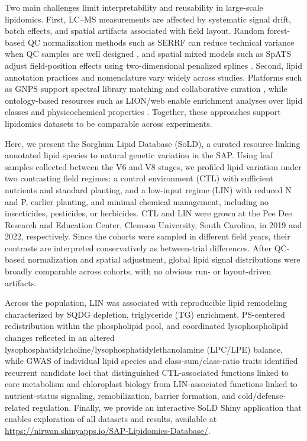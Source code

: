 \documentclass[9pt,twocolumn,twoside]{rilabRxiv}
\begin{document}
Two main challenges limit interpretability and reusability in large-scale lipidomics. First, LC--MS measurements are affected by systematic signal drift, batch effects, and spatial artifacts associated with field layout. Random forest-based QC normalization methods such as SERRF can reduce technical variance when QC samples are well designed \citep{Fan2019}, and spatial mixed models such as SpATS adjust field-position effects using two-dimensional penalized splines \citep{RodriguezAlvarez2018}. Second, lipid annotation practices and nomenclature vary widely across studies. Platforms such as GNPS support spectral library matching and collaborative curation \citep{Wang2016}, while ontology-based resources such as LION/web enable enrichment analyses over lipid classes and physicochemical properties \citep{Molenaar2019}. Together, these approaches support lipidomics datasets to be comparable across experiments.


Here, we present the Sorghum Lipid Database (SoLD), a curated resource linking annotated lipid species to natural genetic variation in the SAP. Using leaf samples collected between the V6 and V8 stages, we profiled lipid variation under two contrasting field regimes: a control environment (CTL) with sufficient nutrients and standard planting, and a low-input regime (LIN) with reduced N and P, earlier planting, and minimal chemical management, including no insecticides, pesticides, or herbicides. CTL and LIN were grown at the Pee Dee Research and Education Center, Clemson University, South Carolina, in 2019 and 2022, respectively. Since the cohorts were sampled in different field years, their contrasts are interpreted conservatively as between-trial differences. After QC-based normalization and spatial adjustment, global lipid signal distributions were broadly comparable across cohorts, with no obvious run- or layout-driven artifacts.

Across the population, LIN was associated with reproducible lipid remodeling characterized by SQDG depletion, triglyceride (TG) enrichment, PS-centered redistribution within the phospholipid pool, and coordinated lysophospholipid changes reflected in an altered lysophosphatidylcholine/lysophosphatidylethanolamine (LPC/LPE) balance, while GWAS of individual lipid species and class-sum/class-ratio traits identified recurrent candidate loci that distinguished CTL-associated functions linked to core metabolism and chloroplast biology from LIN-associated functions linked to nutrient-status signaling, remobilization, barrier formation, and cold/defense-related regulation. Finally, we provide an interactive SoLD Shiny application that enables exploration of all datasets and results, available at \url{https://nirwan.shinyapps.io/SAP-Lipidomics-Database/}.
\end{document}
